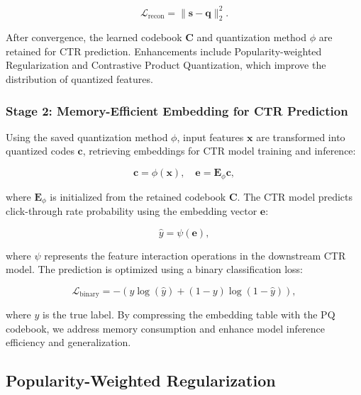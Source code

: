 \begin{equation}  
\mathcal{L}_{\text{recon}} = \| \mathbf{s} - \mathbf{q} \|_2^2.
\end{equation}  

After convergence, the learned codebook $\mathbf{C}$ and quantization method $\phi$ are retained for CTR prediction. Enhancements include Popularity-weighted Regularization and Contrastive Product Quantization, which improve the distribution of quantized features.

\subsubsection{Stage 2: Memory-Efficient Embedding for CTR Prediction}
Using the saved quantization method $\phi$, input features $\mathbf{x}$ are transformed into quantized codes $\mathbf{c}$, retrieving embeddings for CTR model training and inference:

\begin{equation}
\mathbf{c} = \phi(\mathbf{x}), \quad \mathbf{e} = \mathbf{E}_{\phi} \mathbf{c},
\end{equation}

where $\mathbf{E}_{\phi}$ is initialized from the retained codebook $\mathbf{C}$. The CTR model predicts click-through rate probability using the embedding vector $\mathbf{e}$:

\begin{equation}
\hat{y} = \psi(\mathbf{e}),
\end{equation}

where $\psi$ represents the feature interaction operations in the downstream CTR model. The prediction is optimized using a binary classification loss:

\begin{equation}
\mathcal{L}_{\text{binary}} = - (y\log(\hat{y}) + (1-y)\log(1-\hat{y})),
\end{equation}

where $y$ is the true label. By compressing the embedding table with the PQ codebook, we address memory consumption and enhance model inference efficiency and generalization.













    \subsection{Popularity-Weighted Regularization}
        \label{subsec:reg}

